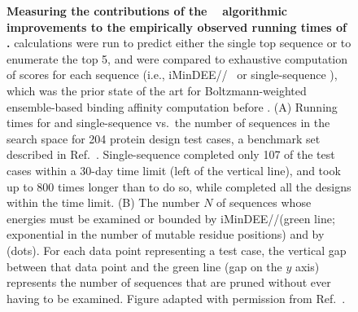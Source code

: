 \begin{figure}
\caption{\textbf{Measuring the contributions of the \bbks~\cite{BBK*} algorithmic improvements to the empirically observed running times of \osprey.}  \bbks calculations were run to predict either the single top sequence or to enumerate the top 5, and were compared to exhaustive computation of \ks scores for each sequence (i.e., iMinDEE/\as/\ks~\cite{minDEE,iMinDEE} or single-sequence \ks), which was the prior state of the art for Boltzmann-weighted ensemble-based binding affinity computation before \bbks.  (A) Running times for \bbks and single-sequence \ks vs.~the number of sequences in the search space for 204 protein design test cases, a benchmark set described in Ref.~.  Single-sequence \ks completed only 107 of the test cases within a 30-day time limit (left of the vertical line), and took up to 800 times longer than \bbks to do so, while \bbks completed all the designs within the time limit.  (B) The number $N$ of sequences whose energies must be examined or bounded by iMinDEE/\as/\ks (green line; exponential in the number of mutable residue positions) and by \bbks (dots). For each data point representing a \bbks test case, the vertical gap between that data point and the green line (gap on the $y$ axis) represents the number of sequences that are pruned without ever having to be examined.  Figure adapted with permission from Ref.~.  }
\label{fig:bbks}
\end{figure}


